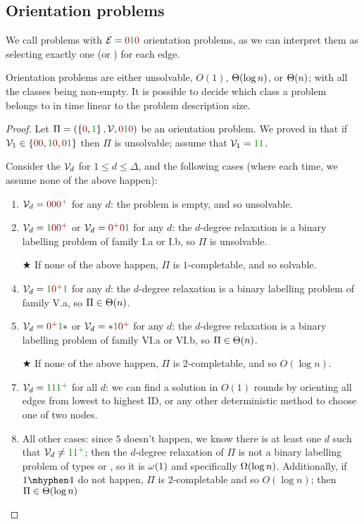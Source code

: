 \documentclass[12pt,a4paper]{article}
\begin{document}
\subsection{Orientation problems}
We call problems with $\Ec=\n\y\n$ orientation problems, as we can interpret them as selecting exactly one  (or ) for each edge.
\begin{thm}\label{thm:or}
    Orientation problems are either unsolvable, $O(1)$, $\Theta(\log n)$, or $\Theta(n)$; with all the classes being non-empty. It is possible to decide which class a problem belongs to in time linear to the problem description size.
\end{thm}
\begin{proof}
    Let $\Pi=(\Set{\n,\y},\Vc,\n\y\n)$ be an orientation problem. We proved in  that if $\Vc_1\in\Set{\n\n,\y\n,\n\y}$ then $\Pi$ is unsolvable; assume that $\Vc_1=\y\y$.
    
    Consider the $\mathcal{V}_d$ for $1\leq d \leq \Delta$, and the following cases (where each time, we assume none of the above happen):
    \begin{enumerate}
        \item $\Vc_d=\n\n\npl$ for any $d$: the problem is empty, and so unsolvable.
        \item $\Vc_d=\y\n\npl$ or $\Vc_d=\npl\n\y$ for any $d$: the $d$-degree relaxation is a binary labelling problem of family \textsf{I.a} or \textsf{I.b}, so $\Pi$ is unsolvable.
        \item[$\bigstar$] If none of the above happen, $\Pi$ is $1$-completable, and so solvable.
        \item $\Vc_d=\y\npl\y$ for any $d$: the $d$-degree relaxation is a binary labelling problem of family \textsf{V.a}, so $\Pi\in\Theta(n)$.
        \item $\Vc_d=\npl\y\x$ or $\Vc_d=\x\y\npl$ for any $d$: the $d$-degree relaxation is a binary labelling problem of family \textsf{VI.a} or \textsf{VI.b}, so $\Pi\in\Theta(n)$.
        \item[$\bigstar$] If none of the above happen, $\Pi$ is $2$-completable, and so $O(\log n)$.
        \item $\Vc_d=\y\y\ypl$ for all $d$: we can find a solution in $O(1)$ rounds by orienting all edges from lowest to highest ID, or any other deterministic method to choose one of two nodes.
        \item All other cases: since $5$ doesn't happen, we know there is at least one $d$ such that $\Vc_d\neq\y\ypl$; then the $d$-degree relaxation of $\Pi$ is not a binary labelling problem of types  or , so it is $\omega(1)$ and specifically $\Omega(\log n)$. Additionally, if $1\mhyphen 4$ do not happen, $\Pi$ is $2$-completable and so $O(\log n)$; then $\Pi\in\Theta(\log n)$
    \end{enumerate}
\end{proof}
\end{document}
